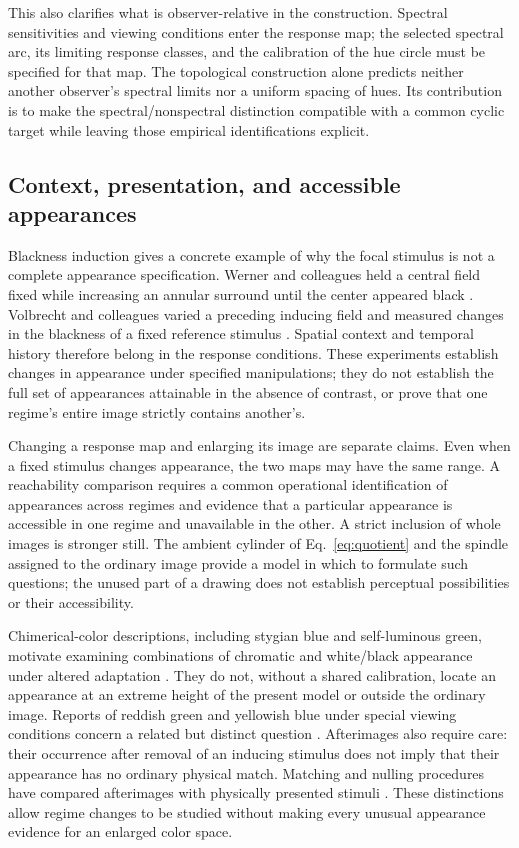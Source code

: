 \documentclass[11pt,letterpaper]{article}
\theoremstyle{plain}
\begin{document}
This also clarifies what is observer-relative in the construction. Spectral sensitivities and viewing conditions enter the response map; the selected spectral arc, its limiting response classes, and the calibration of the hue circle must be specified for that map. The topological construction alone predicts neither another observer's spectral limits nor a uniform spacing of hues. Its contribution is to make the spectral/nonspectral distinction compatible with a common cyclic target while leaving those empirical identifications explicit.

\subsection{Context, presentation, and accessible appearances}
\label{sec:context-appearance}
Blackness induction gives a concrete example of why the focal stimulus is not a complete appearance specification. Werner and colleagues held a central field fixed while increasing an annular surround until the center appeared black \cite{Werner1984}. Volbrecht and colleagues varied a preceding inducing field and measured changes in the blackness of a fixed reference stimulus \cite{Volbrecht1989}. Spatial context and temporal history therefore belong in the response conditions. These experiments establish changes in appearance under specified manipulations; they do not establish the full set of appearances attainable in the absence of contrast, or prove that one regime's entire image strictly contains another's.

Changing a response map and enlarging its image are separate claims. Even when a fixed stimulus changes appearance, the two maps may have the same range. A reachability comparison requires a common operational identification of appearances across regimes and evidence that a particular appearance is accessible in one regime and unavailable in the other. A strict inclusion of whole images is stronger still. The ambient cylinder of Eq.~\eqref{eq:quotient} and the spindle assigned to the ordinary image provide a model in which to formulate such questions; the unused part of a drawing does not establish perceptual possibilities or their accessibility.

Chimerical-color descriptions, including stygian blue and self-luminous green, motivate examining combinations of chromatic and white/black appearance under altered adaptation \cite{Churchland2005}. They do not, without a shared calibration, locate an appearance at an extreme height of the present model or outside the ordinary image. Reports of reddish green and yellowish blue under special viewing conditions concern a related but distinct question \cite{Crane1983}. Afterimages also require care: their occurrence after removal of an inducing stimulus does not imply that their appearance has no ordinary physical match. Matching and nulling procedures have compared afterimages with physically presented stimuli \cite{Powell2012}. These distinctions allow regime changes to be studied without making every unusual appearance evidence for an enlarged color space.
\end{document}
